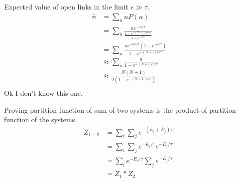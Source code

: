 \documentclass[newpage]{homework}
\begin{document}
Expected value of open links in the limit $\epsilon \gg \tau$.
\begin{align*}
    \bar{n}	&=	\sum_n nP(n)	\\
    &=	\sum_n \frac{ne^{-n\epsilon/\tau}}{\frac{1-e^{-(N+1)\epsilon/tau}}{1-e^{-\epsilon/\tau}}}	\\
    &=	\sum_n \frac{ne^{-n\epsilon/\tau}(1-e^{-\epsilon/\tau})}{1-e^{-(N+1)\epsilon/\tau}}	\\
    &\approx \sum_n \frac{n}{1-e^{-(N+1)\epsilon/\tau}} \\
    &\approx \frac{N(N+1)}{2(1-e^{-(N+1)\epsilon/\tau})}   \\
\end{align*}
Ok I don't know this one.


\question
Proving partition function of sum of two systems is the product of partition function of the systems.
\begin{align*}
    Z_{1+2}	&=	\sum_i \sum_j e^{-(E_i + E_j)/\tau}  \\
            &=  \sum_i \sum_j e^{-E_i/\tau} e^{-E_j/\tau}  \\
            &=	\sum_i e^{-E_i/\tau} \sum_j	e^{-E_j/\tau}  \\
            &=  \boxed{Z_1 * Z_2}
\end{align*}
\end{document}
